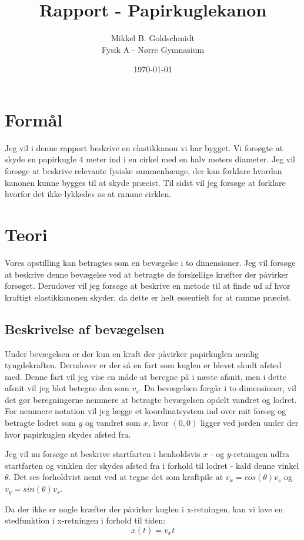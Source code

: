 \documentclass[12pt,a4paper]{article}
\author{Mikkel B. Goldschmidt \\ Fysik A - Nørre Gymnasium}
\title{Rapport - Papirkuglekanon}
\date{\today}
\theoremstyle{break}
\theoremstyle{nonumberplain}
\begin{document}
\maketitle

\section{Formål}
Jeg vil i denne rapport beskrive en elastikkanon vi har bygget. 
Vi forsøgte at skyde en papirkugle 4 meter ind i en cirkel med en halv meters diameter.
Jeg vil forsøge at beskrive relevante fysiske sammenhænge, der kan forklare hvordan kanonen kunne bygges til at skyde præcist. 
Til sidst vil jeg forsøge at forklare hvorfor det ikke lykkedes os at ramme cirklen.

\section{Teori}
Vores opstilling kan betragtes som en bevægelse i to dimensioner.
Jeg vil forsøge at beskrive denne bevægelse ved at betragte de forskellige kræfter der påvirker forsøget.
Derudover vil jeg forsøge at beskrive en metode til at finde ud af hvor kraftigt elastikkanonen skyder, da dette er helt essentielt for at ramme præcist.

\subsection{Beskrivelse af bevægelsen}
Under bevægelsen er der kun en kraft der påvirker papirkuglen nemlig tyngdekraften.
Derudover er der så en fart som kuglen er blevet skudt afsted med.
Denne fart vil jeg vise en måde at beregne på i næste afsnit, men i dette afsnit vil jeg blot betegne den som $v_s$.
Da bevægelsen forgår i to dimensioner, vil det gør beregningerne nemmere at betragte bevægelsen opdelt vandret og lodret.
For nemmere notation vil jeg lægge et koordinatsystem ind over mit forsøg og betragte lodret som $y$ og vandret som $x$, hvor $(0,0)$ ligger ved jorden under der hvor papirkuglen skydes afsted fra.

Jeg vil nu forsøge at beskrive startfarten i henholdsvis $x$
- og $y$-retningen udfra startfarten og vinklen der skydes afsted fra i forhold til lodret - kald denne vinkel $\theta$.
Det ses forholdvist nemt ved at tegne det som kraftpile at $v_x = cos(\theta )v_s$ og $v_y = sin(\theta )v_s$.

Da der ikke er nogle kræfter der påvirker kuglen i x-retningen, kan vi lave en stedfunktion i x-retningen i forhold til tiden: $$x(t) = v_x t$$
\end{document}
